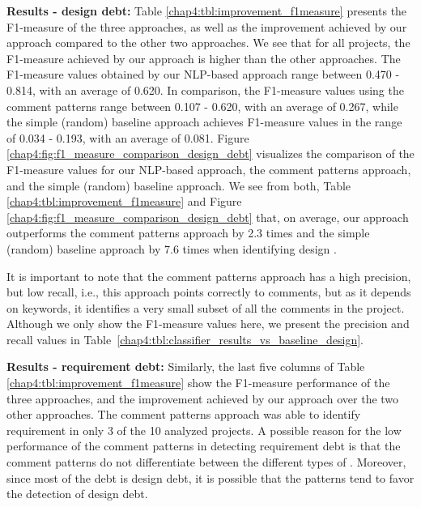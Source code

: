 \vspace{1mm}

\noindent \textbf{Results - design debt:} Table \ref{chap4:tbl:improvement_f1measure} presents the F1-measure of the three approaches, as well as the improvement achieved by our approach compared to the other two approaches. We see that for all projects, the F1-measure achieved by our approach is higher than the other approaches. The F1-measure values obtained by our NLP-based approach range between 0.470 - 0.814, with an average of 0.620. In comparison, the F1-measure values using the comment patterns range between 0.107 - 0.620, with an average of 0.267, while the simple (random) baseline approach achieves F1-measure values in the range of 0.034 - 0.193, with an average of 0.081. Figure \ref{chap4:fig:f1_measure_comparison_design_debt} visualizes the comparison of the F1-measure values for our NLP-based approach, the comment patterns approach, and the simple (random) baseline approach. We see from both, Table \ref{chap4:tbl:improvement_f1measure} and Figure \ref{chap4:fig:f1_measure_comparison_design_debt} that, on average, our approach outperforms the comment patterns approach by 2.3 times and the simple (random) baseline approach by 7.6 times when identifying design \SATD.

It is important to note that the comment patterns approach has a high precision, but low recall, i.e., this approach points correctly to \SATD comments, but as it depends on keywords, it identifies a very small subset of all the \SATD comments in the project. Although we only show the F1-measure values here, we present the precision and recall values in Table~\ref{chap4:tbl:classifier_results_vs_baseline_design}.  

\noindent \textbf{Results - requirement debt:} Similarly, the last five columns of Table \ref{chap4:tbl:improvement_f1measure} show the F1-measure performance of the three approaches, and the improvement achieved by our approach over the two other approaches. The comment patterns approach was able to identify requirement \SATD in only 3 of the 10 analyzed projects. A possible reason for the low performance of the comment patterns in detecting requirement debt is that the comment patterns do not differentiate between the different types of \SATD. Moreover, since most of the debt is design debt, it is possible that the patterns tend to favor the detection of design debt.
 
